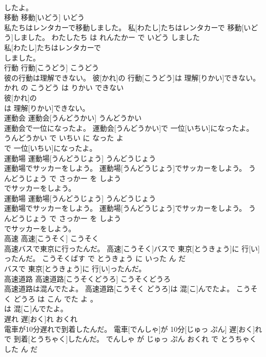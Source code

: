 \documentclass[8pt]{extreport}
\begin{document}
\begin{CJK}{UTF8}{min}
\\	したよ。			
\\	移動	移動[いどう]	いどう	
\\	私たちはレンタカーで移動しました。	私[わたし]たちはレンタカーで 移動[いどう]しました。	わたしたち は れんたかー で いどう しました	
\\	私[わたし]たちはレンタカーで
\\	しました。			
\\	行動	行動[こうどう]	こうどう	
\\	彼の行動は理解できない。	彼[かれ]の 行動[こうどう]は 理解[りかい]できない。	かれ の こうどう は りかい できない	
\\	彼[かれ]の
\\	は 理解[りかい]できない。			
\\	運動会	運動会[うんどうかい]	うんどうかい	
\\	運動会で一位になったよ。	運動会[うんどうかい]で 一位[いちい]になったよ。	うんどうかい で いちい に なった よ	
\\	で 一位[いちい]になったよ。			
\\	運動場	運動場[うんどうじょう]	うんどうじょう	
\\	運動場でサッカーをしよう。	運動場[うんどうじょう]でサッカーをしよう。	うんどうじょう で さっかー を しよう	
\\	でサッカーをしよう。			
\\	運動場	運動場[うんどうじょう]	うんどうじょう	
\\	運動場でサッカーをしよう。	運動場[うんどうじょう]でサッカーをしよう。	うんどうじょう で さっかー を しよう	
\\	でサッカーをしよう。			
\\	高速	高速[こうそく]	こうそく	
\\	高速バスで東京に行ったんだ。	高速[こうそく]バスで 東京[とうきょう]に 行[い]ったんだ。	こうそくばす で とうきょう に いった ん だ	
\\	バスで 東京[とうきょう]に 行[い]ったんだ。			
\\	高速道路	高速道路[こうそくどうろ]	こうそくどうろ	
\\	高速道路は混んでたよ。	高速道路[こうそく どうろ]は 混[こ]んでたよ。	こうそく どうろ は こん でた よ 。	
\\	は 混[こ]んでたよ。			
\\	遅れ	遅[おく]れ	おくれ	
\\	電車が10分遅れで到着したんだ。	電車[でんしゃ]が 10分[じゅっ ぷん] 遅[おく]れで 到着[とうちゃく]したんだ。	でんしゃ が じゅっ ぷん おくれ で とうちゃく した ん だ	

\end{CJK}
\end{document}
